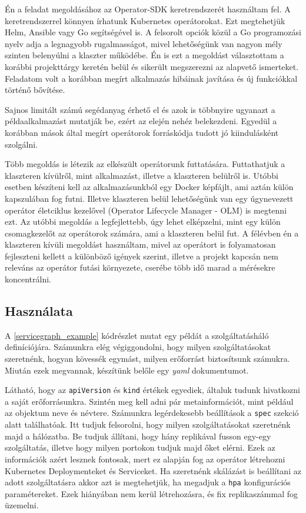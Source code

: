 Én a feladat megoldásához az Operator-SDK\citep{operatorSDK} keretrendszerét használtam fel. 
A keretrendszerrel könnyen írhatunk Kubernetes operátorokat.
Ezt megtehetjük Helm, Ansible vagy Go segítségével is.
A felsorolt opciók közül a Go programozási nyelv adja a legnagyobb rugalmasságot, mivel lehetőségünk van nagyon mély szinten belenyúlni a klaszter működébe.
Én is ezt a megoldást választottam a korábbi projekttárgy keretén belül és sikerült megszerezni az alapvető ismerteket. 
Feladatom volt a korábban megírt alkalmazás hibáinak javítása és új funkciókkal történő bővítése.

Sajnos limitált számú segédanyag érhető el és azok is többnyire ugyanazt a példaalkalmazást mutatják be, ezért az elején nehéz belekezdeni.
Egyedül a korábban mások által megírt operátorok forráskódja tudott jó kiindulásként szolgálni.

Több megoldás is létezik az elkészült operátorunk futtatására.
Futtathatjuk a klaszteren kívülről, mint alkalmazást, illetve a klaszteren belülről is.
Utóbbi esetben készíteni kell az alkalmazásunkból egy Docker képfájlt, ami aztán külön kapszulában fog futni. 
Illetve klaszteren belül lehetőségünk van egy úgynevezett operátor életciklus kezelővel (Operator Lifecycle Manager - OLM) is megtenni ezt. 
Az utóbbi megoldás a legfejlettebb, úgy lehet elképzelni, mint egy külön csomagkezelőt az operátorok számára, ami a klaszteren belül fut. 
A félévben én a klaszteren kívüli megoldást használtam, mivel az operátort is folyamatosan fejleszteni kellett a különböző igények szerint, illetve a projekt kapcsán nem releváns az operátor futási környezete, cserébe több idő marad a mérésekre koncentrálni.

\subsection{Használata}
A \ref{servicegraph_example} kódrészlet mutat egy példát a szolgáltatásháló definíciójára. 
Számunkra elég végiggondolni, hogy milyen szolgáltatásokat szeretnénk, hogyan kövessék egymást, milyen erőforrást biztosítsunk számukra.
Miután ezek megvannak, készítünk belőle egy \textit{yaml} dokumentumot.

Látható, hogy az \verb+apiVersion+ és \verb+kind+ értékek egyediek, általuk tudunk hivatkozni a saját erőforrásunkra.
Szintén meg kell adni pár metainformációt, mint például az objektum neve és névtere.
Számunkra legérdekesebb beállítások a \verb+spec+ szekció alatt találhatóak.
Itt tudjuk felsorolni, hogy milyen szolgáltatásokat szeretnénk majd a hálózatba.
Be tudjuk állítani, hogy hány replikával fusson egy-egy szolgáltatás, illetve hogy milyen portokon tudjuk majd őket elérni. 
Ezek az információk azért lesznek fontosak, mert ez alapján fog az operátor létrehozni Kubernetes Deploymenteket és Serviceket. 
Ha szeretnénk skálázást is beállítani az adott szolgáltatásra akkor azt is megtehetjük, ha megadjuk a \verb+hpa+ konfigurációs paramétereket. 
Ezek hiányában nem kerül létrehozásra, és fix replikaszámmal fog üzemelni.

